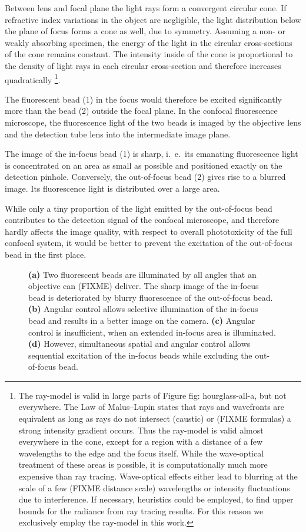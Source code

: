 Between lens and focal plane the light rays form a convergent circular
cone. If refractive index variations in the object are negligible, the
light distribution below the plane of focus forms a cone as well, due
to symmetry.  Assuming a non- or weakly absorbing specimen, the energy
of the light in the circular cross-sections of the cone remains
constant. The intensity inside of the cone is proportional to the
density of light rays in each circular cross-section and therefore
increases quadratically \footnote{The ray-model is valid in large
  parts of Figure fig: hourglass-all-a, but not everywhere. The Law of
  Malus--Lupin states that rays and wavefronts are equivalent as long
  as rays do not intersect (caustic) or (FIXME formulas) a strong
  intensity gradient occurs. Thus the ray-model is valid almost
  everywhere in the cone, except for a region with a distance of a few
  wavelengths to the edge and the focus itself. While the wave-optical
  treatment of these areas is possible, it is computationally much
  more expensive than ray tracing. Wave-optical effects either lead to
  blurring at the scale of a few (FIXME distance scale) wavelengths or
  intensity fluctuations due to interference. If necessary, heuristics
  could be employed, to find upper bounds for the radiance from ray
  tracing results. For this reason we exclusively employ the ray-model
  in this work.}.


The fluorescent bead (1) in the focus would therefore be excited
significantly more than the bead (2) outside the focal plane. In the
confocal fluorescence microscope, the fluorescence light of the two
beads is imaged by the objective lens and the detection tube lens into
the intermediate image plane.

The image of the in-focus bead (1) is sharp, i.\ e.\ its emanating fluorescence
light is concentrated on an area as small as possible and positioned
exactly on the detection pinhole. Conversely, the out-of-focus
bead (2) gives rise to a blurred image. Its fluorescence light is
distributed over a large area.

While only a tiny proportion of the light emitted by the out-of-focus
bead contributes to the detection signal of the confocal microscope,
and therefore hardly affects the image quality, with respect to
overall phototoxicity of the full confocal system, it would be better
to prevent the excitation of the out-of-focus bead in the first place.

\begin{figure}[!hbt]
  \centering
  \caption{{\bf (a)} Two fluorescent beads are illuminated by all
    angles that an objective can (FIXME) deliver. The sharp image of the
    in-focus bead is deteriorated by blurry fluorescence of the
    out-of-focus bead. {\bf (b)} Angular control allows selective
    illumination of the in-focus bead and results in a better image on
    the camera. {\bf (c)} Angular control is insufficient, when an
    extended in-focus area is illuminated. {\bf (d)} However,
    simultaneous spatial and angular control allows sequential
    excitation of the in-focus beads while excluding the out-of-focus
    bead.}
  \label{fig:hourglass-all}
\end{figure}



